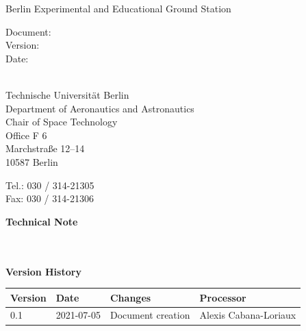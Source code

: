 \begin{titlepage}
\begin{center}
    \large{Berlin Experimental and Educational Ground Station}

    \vfill

    \normalfont\normalsize Document: \nr \\
    Version: \ver\\
    Date: \dat

    \vfill


    \normalfont\normalsize \hspace{0pt}\\
    Technische Universit\"at Berlin\\
    Department of Aeronautics and Astronautics\\
    Chair of Space Technology\\
    Office F 6\\
    Marchstraße 12--14\\
    10587 Berlin

    Tel.: 030 / 314-21305\\
    Fax: 030 / 314-21306
  \end{center}
\end{titlepage}



\begin{titlepage}
  \begin{center}
    \textbf{\huge{Technical Note}\\\hspace{0pt}}
    
    \ \\
    \ \\
    \textbf{Version History\\\hspace{0pt}}
    
    \begin{tabular*}{\textwidth}
      {%
        @{}p{}
        p{}
        p{}
        p{}@{}
      }
      \toprule
      Version & Date & Changes & Processor \\
      \midrule
      0.1 & 2021-07-05 & Document creation  & Alexis Cabana-Loriaux \\
      \bottomrule
    \end{tabular*}%
    
    \vfill
    
    \thispagestyle{TUB}
    
    \pagebreak
    
     
    
    
    
    
  \vfill

     \end{center}%
  \thispagestyle{TUB}%
\end{titlepage}

